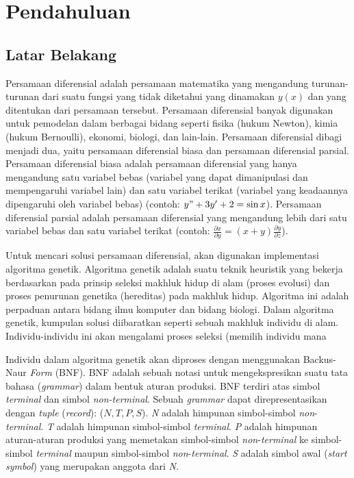 \chapter{Pendahuluan}
\label{chap:intro}

\section{Latar Belakang}
\label{sec:label}

Persamaan diferensial adalah persamaan matematika yang mengandung turunan-turunan dari suatu fungsi yang tidak diketahui yang dinamakan \begin{math} y(x) \end{math} dan yang ditentukan dari persamaan tersebut. Persamaan diferensial banyak digunakan untuk pemodelan dalam berbagai bidang seperti fisika (hukum Newton), kimia (hukum Bernoulli), ekonomi, biologi, dan lain-lain. Persamaan diferensial dibagi menjadi dua, yaitu persamaan diferensial biasa dan persamaan diferensial parsial. Persamaan diferensial biasa adalah persamaan diferensial yang hanya mengandung satu variabel bebas (variabel yang dapat dimanipulasi dan mempengaruhi variabel lain) dan satu variabel terikat (variabel yang keadaannya dipengaruhi oleh variabel bebas) (contoh: \begin{math}y"+3y'+2 =\sin x\end{math}). Persamaan diferensial parsial adalah persamaan diferensial yang mengandung lebih dari satu variabel bebas dan satu variabel terikat (contoh: \begin{math} \frac{\partial x}{\partial y} = (x+y) \frac{\partial y}{\partial z}\end{math}).

Untuk mencari solusi persamaan diferensial, akan digunakan implementasi algoritma genetik. Algoritma genetik adalah suatu teknik heuristik yang bekerja berdasarkan pada prinsip seleksi makhluk hidup di alam (proses evolusi) dan proses penurunan genetika (hereditas) pada makhluk hidup. Algoritma ini adalah perpaduan antara bidang ilmu komputer dan bidang biologi. Dalam algoritma genetik, kumpulan solusi diibaratkan seperti sebuah makhluk individu di alam. Individu-individu ini akan mengalami proses seleksi (memilih individu mana 


Individu dalam algoritma genetik akan diproses dengan menggunakan Backus-Naur \textit{Form} (BNF). BNF adalah sebuah notasi untuk mengekspresikan suatu tata bahasa (\textit{grammar}) dalam bentuk aturan produksi. BNF terdiri atas simbol \textit{terminal} dan simbol \textit{non-terminal}. Sebuah \textit{grammar} dapat direpresentasikan dengan \textit{tuple} (\textit{record}): (\begin{math} {N, T, P, S} \end{math}). \textit{N} adalah himpunan simbol-simbol \textit{non}-\textit{terminal}. \textit{T} adalah himpunan simbol-simbol \textit{terminal}. \textit{P} adalah himpunan aturan-aturan produksi yang memetakan simbol-simbol \textit{non}-\textit{terminal} ke simbol-simbol \textit{terminal} maupun simbol-simbol \textit{non}-\textit{terminal}. \textit{S} adalah simbol awal (\textit{start symbol}) yang merupakan anggota dari \textit{N}.

